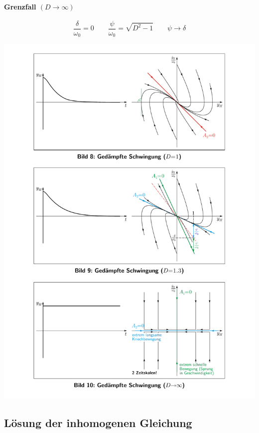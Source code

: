 \documentclass[9pt,fleqn,ngerman,article]{memoir}
\begin{document}
\begin{multicols*}{3}
					\paragraph{Grenzfall $(D \to \infty)$} %
						
						\[
							\frac{\delta}{\omega_0} = 0 \qquad \frac{\psi}{\omega_0} = \sqrt{D^2 - 1} \qquad \psi \to \delta
						\]
						
						\begin{center}
							\includegraphics[width=\columnwidth]{grafiken/daempfung_d_infty}
						\end{center}
				
			
			\subsection{Lösung der inhomogenen Gleichung} %
				

\end{multicols*}
\end{document}
